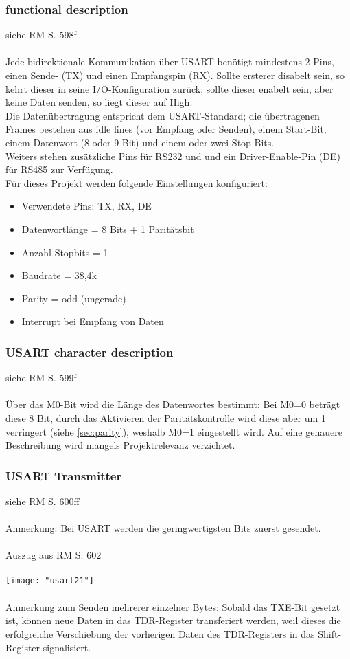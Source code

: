 \documentclass[11pt]{report}
\begin{document}
			\subsubsection{functional description}
				siehe RM S. 598f\\
				\\Jede bidirektionale Kommunikation über USART benötigt mindestens 2 Pins, einen Sende- (TX) und einen Empfangspin (RX). Sollte ersterer disabelt sein, so kehrt dieser in seine I/O-Konfiguration zurück; sollte dieser enabelt sein, aber keine Daten senden, so liegt dieser auf High.\\
				Die Datenübertragung entspricht dem USART-Standard; die übertragenen Frames bestehen aus idle lines (vor Empfang oder Senden), einem Start-Bit, einem Datenwort (8 oder 9 Bit) und einem oder zwei Stop-Bits.\\
				Weiters stehen zusätzliche Pins für RS232 und und ein Driver-Enable-Pin (DE) für RS485 zur Verfügung.\\
				Für dieses Projekt werden folgende Einstellungen konfiguriert:
				\begin{itemize}
					\item Verwendete Pins: TX, RX, DE
					\item Datenwortlänge = 8 Bits + 1 Paritätsbit
					\item Anzahl Stopbits = 1
					\item Baudrate = 38,4k
					\item Parity = odd (ungerade)
					\item Interrupt bei Empfang von Daten
				\end{itemize}
			\subsubsection{USART character description}
				siehe RM S. 599f\\
				\\Über das M0-Bit wird die Länge des Datenwortes bestimmt; Bei M0=0 beträgt diese 8 Bit, durch das Aktivieren der Paritätskontrolle wird diese aber um 1 verringert (siehe \ref{sec:parity}), weshalb M0=1 eingestellt wird. Auf eine genauere Beschreibung wird mangels Projektrelevanz verzichtet.
			\subsubsection{USART Transmitter}
				siehe RM S. 600ff\\
				\\Anmerkung: Bei USART werden die geringwertigsten Bits zuerst gesendet.\\
				\\Auszug aus RM S. 602\\
				\\\texttt{[image: "usart21"]}\\
				\\Anmerkung zum Senden mehrerer einzelner Bytes: Sobald das TXE-Bit gesetzt ist, können neue Daten in das TDR-Register transferiert werden, weil dieses die erfolgreiche Verschiebung der vorherigen Daten des TDR-Registers in das Shift-Register signalisiert.
\end{document}
